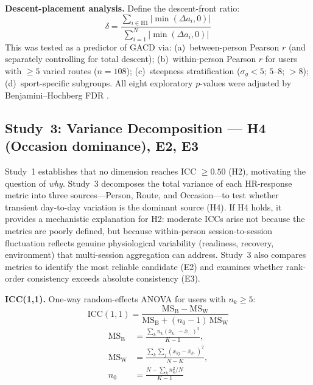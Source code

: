 \documentclass[times, twoside]{zHenriquesLab-StyleBioRxiv}
\begin{document}
\textbf{Descent-placement analysis.} Define the descent-front ratio:
\[
  \delta = \frac{\sum_{i \in \text{H1}} |\min(\Delta a_i, 0)|}{\sum_{i=1}^{N} |\min(\Delta a_i, 0)|}
\]
This was tested as a predictor of GACD via: (a)~between-person Pearson $r$ (and separately controlling for total descent); (b)~within-person Pearson $r$ for users with $\geq 5$ varied routes ($n = 108$); (c)~steepness stratification ($\sigma_g < 5$; $5$--$8$; $> 8$); (d)~sport-specific subgroups. All eight exploratory $p$-values were adjusted by Benjamini--Hochberg FDR \cite{benjamini1995}.

\subsection*{Study~3: Variance Decomposition --- H4 (Occasion dominance), E2, E3}

Study~1 establishes that no dimension reaches ICC $\geq 0.50$ (H2), motivating the question of \textit{why}. Study~3 decomposes the total variance of each HR-response metric into three sources---Person, Route, and Occasion---to test whether transient day-to-day variation is the dominant source (H4). If H4 holds, it provides a mechanistic explanation for H2: moderate ICCs arise not because the metrics are poorly defined, but because within-person session-to-session fluctuation reflects genuine physiological variability (readiness, recovery, environment) that multi-session aggregation can address. Study~3 also compares metrics to identify the most reliable candidate (E2) and examines whether rank-order consistency exceeds absolute consistency (E3).

\textbf{ICC(1,1).} One-way random-effects ANOVA \cite{shrout1979} for users with $n_k \geq 5$:
\[
  \text{ICC}(1,1) = \frac{\text{MS}_{\text{B}} - \text{MS}_{\text{W}}}{\text{MS}_{\text{B}} + (n_0 - 1)\,\text{MS}_{\text{W}}}
\]
\begin{align*}
  \text{MS}_{\text{B}} &= \frac{\textstyle\sum_k n_k (\bar{x}_{k\cdot} - \bar{x}_{\cdot\cdot})^2}{K-1}, \\[4pt]
  \text{MS}_{\text{W}} &= \frac{\textstyle\sum_k \sum_j (x_{kj} - \bar{x}_{k\cdot})^2}{N-K}, \\[4pt]
  n_0 &= \frac{N - \sum_k n_k^2/N}{K-1}
\end{align*}
\end{document}
